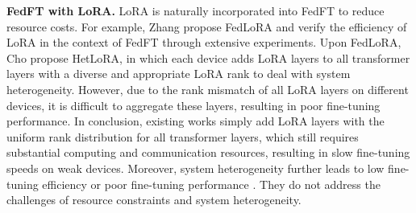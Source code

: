 \textbf{FedFT with LoRA.}
LoRA is naturally incorporated into FedFT to reduce resource costs.
For example, Zhang \etal \cite{zhang2023fedpetuning} propose FedLoRA and verify the efficiency of LoRA in the context of FedFT through extensive experiments.
Upon FedLoRA, Cho \etal \cite{cho2023heterogeneous} propose HetLoRA, in which each device adds LoRA layers to all transformer layers with a diverse and appropriate LoRA rank to deal with system heterogeneity.
However, due to the rank mismatch of all LoRA layers on different devices, it is difficult to aggregate these layers, resulting in poor fine-tuning performance.
In conclusion, existing works simply add LoRA layers with the uniform rank distribution for all transformer layers, which still requires substantial computing and communication resources, resulting in slow fine-tuning speeds on weak devices. 
Moreover, system heterogeneity further leads to low fine-tuning efficiency or poor fine-tuning performance \cite{kim2021autofl, luo2022tackling}.
They do not address the challenges of resource constraints and system heterogeneity.
\vspace{-0.2cm}


